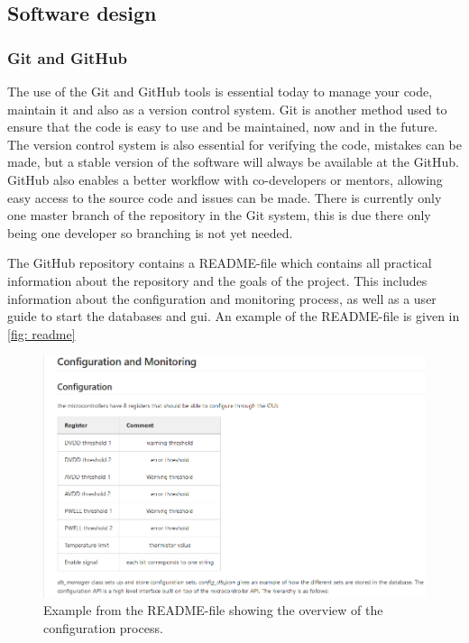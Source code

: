 \documentclass[main.tex]{subfiles}
\begin{document}
\subsection{Software design}

\subsubsection{Git and GitHub}

The use of the Git and GitHub tools is essential today to manage your code, maintain it and also as a version control system. Git is another method used to ensure that the code is easy to use and be maintained, now and in the future. The version control system is also essential for verifying the code, mistakes can be made, but a stable version of the software will always be available at the GitHub. GitHub also enables a better workflow with co-developers or mentors, allowing easy access to the source code and issues can be made. There is currently only one master branch of the repository in the Git system, this is due there only being one developer so branching is not yet needed.

The GitHub repository contains a README-file which contains all practical information about the repository and the goals of the project. This includes information about the configuration and monitoring process, as well as a user guide to start the databases and \gls{gui}. An example of the README-file is given in \autoref{fig: readme}


\begin{figure}[!ht]
    \centering
    \includegraphics[width=18cm]{images/README_example.png}
    \caption{Example from the README-file showing the overview of the configuration process.}
    \label{fig: readme}
\end{figure}
\FloatBarrier
\end{document}

